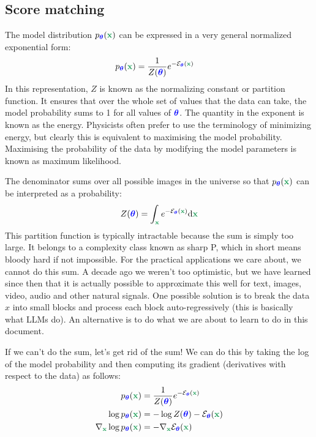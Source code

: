 \documentclass[usenames,dvipsnames]{article}
\newcommand{\myvec}[1]{\mathbf{#1}}
\newcommand{\myvecsym}[1]{\boldsymbol{#1}}
\newcommand{\vx}{\myvec{\textcolor{ForestGreen}{x}}}
\newcommand{\vtheta}{\myvecsym{\textcolor{blue}{\theta}}}
\newcommand{\pT}{p_{\vtheta}}
\begin{document}
\subsection{Score matching}

The model distribution $\pT(\vx)$ can be expressed in a very general normalized exponential form:
\begin{align}
   \pT(\vx) &= \frac{1}{Z(\vtheta)} e^{-{\cal E}_{\vtheta}(\vx)}
   \nonumber
\end{align}
In this representation, $Z$ is known as the normalizing constant or partition function. It ensures that over the whole set of values that the data can take, the model probability sums to 1 for all values of $\vtheta$. The quantity in the exponent is known as the energy. Physicists often prefer to use the terminology of minimizing energy, but clearly this is equivalent to maximising the model probability. Maximising the probability of the data by modifying the model parameters is known as maximum likelihood.


The denominator sums over all possible images in the universe so that $\pT(\vx)$ can be interpreted as a probability:
\begin{align}
   Z(\vtheta) = \int_{\vx} e^{-{\cal E}_{\vtheta}(\vx)} \mathrm{d}\vx
   \nonumber
\end{align}
This partition function is typically intractable because the sum is simply too large. It belongs to a complexity class known as sharp P, which in short means bloody hard if not impossible. For the practical applications we care about, we cannot do this sum. A decade ago we weren't too optimistic, but we have learned since then that it is actually possible to approximate this well for text, images, video, audio and other natural signals.
One possible solution is to break the data $x$ into small blocks and process each block auto-regressively (this is basically what LLMs do). An alternative is to do what we are about to learn to do in this document.

If we can't do the sum, let's get rid of the sum! We can do this by taking the log of the model probability and then computing its gradient (derivatives with respect to the data) as follows:
\begin{align}
   \pT(\vx) &= \frac{1}{Z(\vtheta)} e^{-{\cal E}_{\vtheta}(\vx)} \nonumber \\
   \log \pT(\vx) &= - \log Z(\vtheta) - {\cal E}_{\vtheta}(\vx) \nonumber \\
      \nabla_\vx \log \pT(\vx) &=  - \nabla_\vx {\cal E}_{\vtheta}(\vx)
   \nonumber
\end{align}
\end{document}
